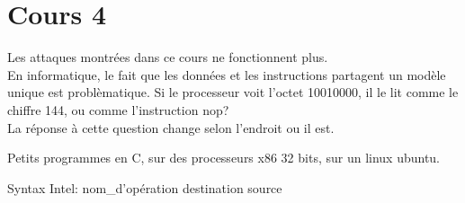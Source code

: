 \section{Cours 4}
Les attaques montrées dans ce cours ne fonctionnent plus.\\
En informatique, le fait que les données et les instructions partagent un modèle unique est problèmatique. Si le
processeur voit l'octet 10010000, il le lit comme le chiffre 144, ou comme l'instruction nop?\\
La réponse à cette question change selon l'endroit ou il est.

Petits programmes en C, sur des processeurs x86 32 bits, sur un linux ubuntu.

Syntax Intel: nom\_d'opération destination source
